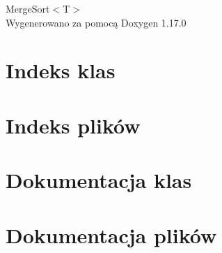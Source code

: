 \documentclass[twoside]{book}
\newcommand{\+}{\discretionary{\mbox{\scriptsize$\hookleftarrow$}}{}{}}
\newcommand{\clearemptydoublepage}{%
    \newpage{\pagestyle{empty}\cleardoublepage}%
  }
\begin{document}
  \raggedbottom
    \hypersetup{pageanchor=false,
                bookmarksnumbered=true,
                pdfencoding=unicode
               }
  \begin{titlepage}
  \vspace*{7cm}
  \begin{center}%
  {\Large Merge\+Sort$<$\+T$>$}\\
  \vspace*{1cm}
  {\large Wygenerowano za pomocą Doxygen 1.17.0}\\
  \end{center}
  \end{titlepage}
  \clearemptydoublepage
  \tableofcontents
  \clearemptydoublepage
  \hypersetup{pageanchor=true}
\chapter{Indeks klas}

\chapter{Indeks plików}

\chapter{Dokumentacja klas}

\chapter{Dokumentacja plików}



  \backmatter
  \newpage
  \clearemptydoublepage
  \printindex
\end{document}
